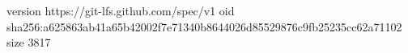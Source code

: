 version https://git-lfs.github.com/spec/v1
oid sha256:a625863ab41a65b42002f7e71340b8644026d85529876c9fb25235cc62a71102
size 3817
